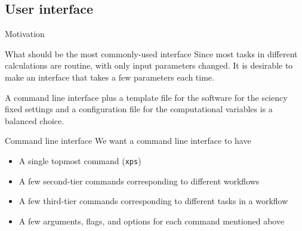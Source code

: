 \subsection{User interface}\label{ssec:ui}

\begin{frame}{Motivation}

    \begin{block}{What should be the most commonly-used interface}
        Since most tasks in different \ab{} calculations are routine, with only
        input parameters changed. It is desirable to make an interface that takes a few
        parameters each time.

        A command line interface plus a template file for the \ab{} software for the sciency
        fixed settings and a configuration file for the computational variables is a
        balanced choice.
    \end{block}

    \begin{block}{Command line interface}
        We want a command line interface to have

        \begin{itemize}
            \item A single topmost command (\texttt{xps})
            \item A few second-tier commands corresponding to different workflows
            \item A few third-tier commands corresponding to different tasks in a workflow
            \item A few arguments, flags, and options for each command mentioned above
        \end{itemize}
    \end{block}

\end{frame}

